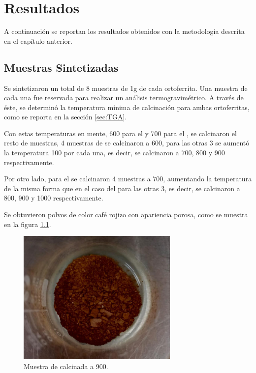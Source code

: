 \documentclass[../main.tex]{subfiles}
\begin{document}
\chapter{Resultados}
A continuación se reportan los resultados obtenidos con la metodología descrita en el capítulo anterior.
\section{Muestras Sintetizadas} \label{sec:sintesis}
Se sintetizaron un total de 8 muestras de 1g de cada ortoferrita. Una muestra de cada una fue reservada para realizar un análisis termogravimétrico. A través de éste, se determinó la temperatura mínima de calcinación para ambas ortoferritas, como se reporta en la sección \ref{sec:TGA}.

Con estas temperaturas en mente, 600\gradoC{} para el \neod{} y 700\gradoC{} para el \sama{}, se calcinaron el resto de muestras, 4 muestras de \neod{} se calcinaron a 600\gradoC{}, para las otras 3 se aumentó la temperatura 100\gradoC{} por cada una, es decir, se calcinaron a 700, 800 y 900\gradoC{} respectivamente.

Por otro lado, para el \sama{} se calcinaron 4 muestras a 700\gradoC{}, aumentando la temperatura de la misma forma que en el caso del \neod{} para las otras 3, es decir, se calcinaron a 800, 900 y 1000\gradoC{} respectivamente.

Se obtuvieron polvos de color café rojizo con apariencia porosa, como se muestra en la figura \ref{fig:resfotomuestra}.
\begin{figure}[H]
    \centering
    \includegraphics[width=0.7\textwidth]{fig/muestraSmFeO3900.jpeg}
    \caption{Muestra de \sama{} calcinada a 900\gradoC.}
    \label{fig:resfotomuestra}
\end{figure}
\end{document}
